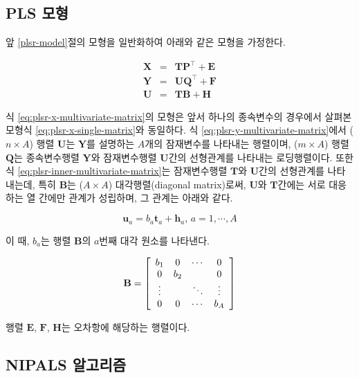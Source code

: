 \documentclass[]{book}
\begin{document}
\hypertarget{plsr-multivariate-model}{%
\subsection{PLS 모형}\label{plsr-multivariate-model}}

앞 \ref{plsr-model}절의 모형을 일반화하여 아래와 같은 모형을 가정한다.

\begin{eqnarray}
\mathbf{X} &=& \mathbf{T} \mathbf{P}^\top + \mathbf{E} \label{eq:plsr-x-multivariate-matrix}\\
\mathbf{Y} &=& \mathbf{U} \mathbf{Q}^\top + \mathbf{F} \label{eq:plsr-y-multivariate-matrix}\\
\mathbf{U} &=& \mathbf{T} \mathbf{B} + \mathbf{H}  \label{eq:plsr-inner-multivariate-matrix}
\end{eqnarray}

식 \eqref{eq:plsr-x-multivariate-matrix}의 모형은 앞서 하나의 종속변수의 경우에서 살펴본 모형식 \eqref{eq:plsr-x-single-matrix}와 동일하다. 식 \eqref{eq:plsr-y-multivariate-matrix}에서 (\(n \times A\)) 행렬 \(\mathbf{U}\)는 \(\mathbf{Y}\)를 설명하는 \(A\)개의 잠재변수를 나타내는 행렬이며, (\(m \times A\)) 행렬 \(\mathbf{Q}\)는 종속변수행렬 \(\mathbf{Y}\)와 잠재변수행렬 \(\mathbf{U}\)간의 선형관계를 나타내는 로딩행렬이다. 또한 식 \eqref{eq:plsr-inner-multivariate-matrix}는 잠재변수행렬 \(\mathbf{T}\)와 \(\mathbf{U}\)간의 선형관계를 나타내는데, 특히 \(\mathbf{B}\)는 (\(A \times A\)) 대각행렬(diagonal matrix)로써, \(\mathbf{U}\)와 \(\mathbf{T}\)간에는 서로 대응하는 열 간에만 관계가 성립하며, 그 관계는 아래와 같다.

\begin{equation*}
\mathbf{u}_a = b_a \mathbf{t}_a + \mathbf{h}_a, \, a = 1, \cdots, A
\end{equation*}

이 때, \(b_a\)는 행렬 \(\mathbf{B}\)의 \(a\)번째 대각 원소를 나타낸다.

\[\mathbf{B} = \left[ \begin{array}{c c c c}
b_{1} & 0 & \cdots & 0\\
0 & b_{2} &  & 0\\
\vdots &  & \ddots & \vdots \\
0 & 0 & \cdots & b_{A}
\end{array} \right]
\]

행렬 \(\mathbf{E}\), \(\mathbf{F}\), \(\mathbf{H}\)는 오차항에 해당하는 행렬이다.

\hypertarget{plsr-multivariate-nipals}{%
\subsection{NIPALS 알고리즘}\label{plsr-multivariate-nipals}}
\end{document}
